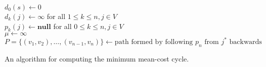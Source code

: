 \documentclass[letterpaper,reqno,12pt]{article}
\begin{document}
\begin{exercise}
  \begin{algorithm}
    $d_0(s) \leftarrow 0$ \\
    $d_k(j) \leftarrow \infty$ for all $1 \leq k \leq n, j \in V$ \\
    $p_k(j) \leftarrow \textbf{null}$ for all $0 \leq k \leq n, j \in V$ \\
    $\mu \leftarrow \infty$ \\
    $P = \{ (v_1, v_2), \ldots, (v_{n - 1}, v_n) \} \leftarrow \text{path formed by following $p_n$ from $j^*$ backwards}$ \\
    \caption{An algorithm for computing the minimum mean-cost cycle.}
    \label{alg:min-mean-cost-cycle}
  \end{algorithm}
\end{exercise}
\end{document}
